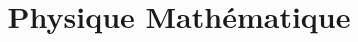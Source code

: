 \documentclass[a4paper, 12pt]{report}
\title{Physique Mathématique}
\author{}
\begin{document}
\maketitle

\begin{abstract}

\end{abstract}

\tableofcontents



\end{document}
